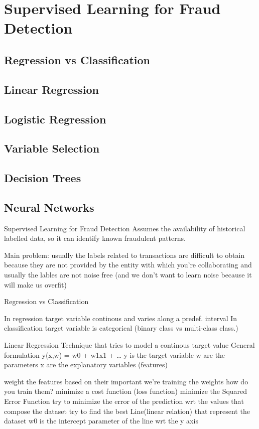 \section{Supervised Learning for Fraud Detection}
    \subsection{Regression vs Classification}
    \subsection{Linear Regression}
    \subsection{Logistic Regression}
    \subsection{Variable Selection}
    \subsection{Decision Trees}
    \subsection{Neural Networks}
\iffalse
Supervised Learning for Fraud Detection
    Assumes the availability of historical labelled data, so it can identify known fraudulent patterns.

    Main problem: usually the labels related to transactions are difficult to obtain
        because they are not provided by the entity with which you're collaborating
        and usually the lables are not noise free (and we don't want to learn noise because it will make us overfit)

    Regression vs Classification 
    
    In regression target variable continous and varies along a predef. interval
    In classification target variable is categorical (binary class vs multi-class class.)

    Linear Regression 
        Technique that tries to model a continous target value
        General formulation 
        y(x,w) = w0 + w1x1 + \dots
        y is the target variable 
        w are the parameters 
        x are the explanatory variables (features)

        weight the features based on their important
        we're training the weights 
        how do you train them?
            minimize a cost function (loss function)
            minimize the Squared Error Function 
            try to minimize the error of the prediction wrt the values that compose the dataset
            try to find the best Line(linear relation) that represent the dataset
            w0 is the intercept parameter of the line wrt the y axis 

